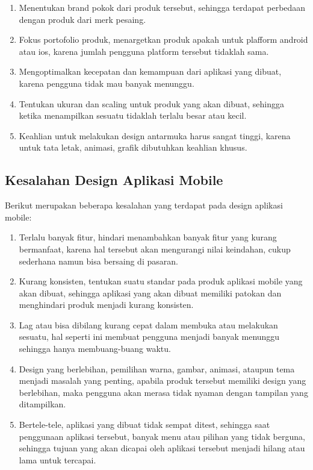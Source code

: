\begin{enumerate}
	\item Menentukan brand pokok dari produk tersebut, sehingga terdapat perbedaan dengan produk dari merk pesaing.
	\item Fokus portofolio produk, menargetkan produk apakah untuk plafform android atau ios, karena jumlah pengguna platform tersebut tidaklah sama.
	\item Mengoptimalkan kecepatan dan kemampuan dari aplikasi yang dibuat, karena pengguna tidak mau banyak menunggu.
	\item Tentukan ukuran dan scaling untuk produk yang akan dibuat, sehingga ketika menampilkan sesuatu tidaklah terlalu besar atau kecil.
	\item Keahlian untuk melakukan design antarmuka harus sangat tinggi, karena untuk tata letak, animasi, grafik dibutuhkan keahlian khusus. 
\end{enumerate}

\subsection{Kesalahan Design Aplikasi Mobile}
\label{sec:kesalahanUI}
Berikut merupakan beberapa kesalahan yang terdapat pada design aplikasi mobile:
\begin{enumerate}
	\item Terlalu banyak fitur, hindari menambahkan banyak fitur yang kurang bermanfaat, karena hal tersebut akan mengurangi nilai keindahan, cukup sederhana namun bisa bersaing di pasaran.
	\item Kurang konsisten, tentukan suatu standar pada produk aplikasi mobile yang akan dibuat, sehingga aplikasi yang akan dibuat memiliki patokan dan menghindari produk menjadi kurang konsisten.
	\item Lag atau bisa dibilang kurang cepat dalam membuka atau melakukan sesuatu, hal seperti ini membuat pengguna menjadi banyak menunggu sehingga hanya membuang-buang waktu.
	\item Design yang berlebihan, pemilihan warna, gambar, animasi, ataupun tema menjadi masalah yang penting, apabila produk tersebut memiliki design yang berlebihan, maka pengguna akan merasa tidak nyaman dengan tampilan yang ditampilkan.
	\item Bertele-tele, aplikasi yang dibuat tidak sempat ditest, sehingga saat penggunaan aplikasi tersebut, banyak menu atau pilihan yang tidak berguna, sehingga tujuan yang akan dicapai oleh aplikasi tersebut menjadi hilang atau lama untuk tercapai.
\end{enumerate}

